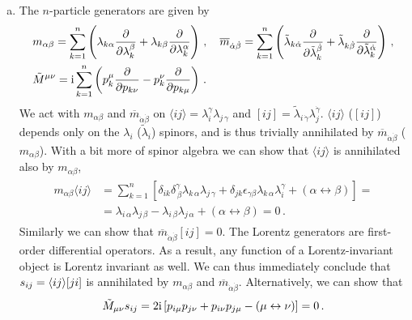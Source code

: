 \begin{enumerate}[a)]
\smallskip
\item The $n$-particle generators are given by
\begin{equation}
\begin{aligned}
& m_{\alpha \beta} = \sum_{k=1}^n \left( \lambda_{k \alpha} \frac{\partial}{\partial \lambda_k^{\beta}} + \lambda_{k \beta} \frac{\partial}{\partial \lambda_k^{\alpha}}\right) \,, \quad 
\overline{m}_{\dot\alpha \dot\beta} = \sum_{k=1}^n \left( \tilde{\lambda}_{k  \dot\alpha} \frac{\partial}{\partial \tilde{\lambda}_k^{\dot\beta}} + \tilde{\lambda}_{k \dot\beta} \frac{\partial}{\partial \tilde{\lambda}_k^{\dot\alpha}}\right) \,, \\
& \tilde{M}^{\mu \nu} = \mathrm{i} \sum_{k=1}^n \left( p_k^{\mu} \frac{\partial}{\partial p_{k \nu}} - p_k^{\nu} \frac{\partial}{\partial p_{k \mu}} \right) \,.
\end{aligned}
\end{equation}
We act with $m_{\alpha \beta}$ and $\overline{m}_{\dot\alpha \dot\beta}$ on $\langle ij \rangle = \lambda_i^{\gamma} \lambda_{j\,\gamma}$ and $[ ij ] = \tilde{\lambda}_{i \, \dot\gamma} \lambda_{j}^{\dot\gamma}$. $\langle ij \rangle$ ($[ij]$) depends only on the $\lambda_i$ ($\tilde{\lambda}_i$) spinors, and is thus trivially annihilated by $\overline{m}_{\dot\alpha \dot\beta}$ ($m_{\alpha \beta}$). With a bit more of spinor algebra we can show that $\langle ij \rangle$ is annihilated also by $m_{\alpha \beta}$,
\begin{align}
\begin{aligned}
m_{\alpha \beta} \langle ij \rangle & = \sum_{k=1}^n \left[
   \delta_{ik} \delta^{\gamma}_{\, \beta} \lambda_{k \, \alpha} \lambda_{j \, \gamma} +
   \delta_{jk} \epsilon_{\gamma \beta} \lambda_{k \, \alpha} \lambda_i^{\gamma} + \left( \alpha \leftrightarrow \beta \right) \right] = \\
   & =  \lambda_{i \, \alpha} \lambda_{j \, \beta} -  \lambda_{i \, \beta} \lambda_{j \, \alpha} + \left( \alpha \leftrightarrow \beta \right) = 0 \,.
\end{aligned}
\end{align}
Similarly we can show that $\overline{m}_{\dot\alpha \dot\beta} [ij] =0 $. The Lorentz generators are first-order differential operators. As a result, any function of a Lorentz-invariant object is Lorentz invariant as well. We can thus immediately conclude that $s_{ij} = \langle ij\rangle[ji]$ is annihilated by $m_{\alpha \beta}$ and $\overline{m}_{\dot\alpha \dot\beta}$. Alternatively, we can show that
\begin{align}
\tilde{M}_{\mu \nu} s_{ij} = 2 \mathrm{i} \left[ p_{i \mu} p_{j \nu} +  p_{i \nu} p_{j \mu}  - \left(\mu \leftrightarrow \nu \right) \right] = 0 \,.
\end{align}

\end{enumerate}


